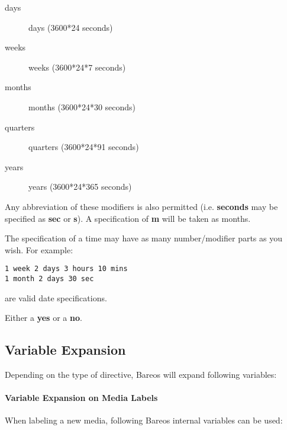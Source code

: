 \begin{description}
\begin{description}
\item [days]
   days (3600*24 seconds)

\item [weeks]
   weeks (3600*24*7 seconds)

\item [months]
   months (3600*24*30 seconds)

\item [quarters]
   quarters (3600*24*91 seconds)

\item [years]
   years (3600*24*365 seconds)
\end{description}

Any abbreviation of these modifiers is also permitted (i.e.  {\bf seconds}
may be specified as {\bf sec} or {\bf s}).  A specification of {\bf m} will
be taken as months.

The specification of a time may have as many number/modifier parts as you
wish.  For example:

\footnotesize
\begin{verbatim}
1 week 2 days 3 hours 10 mins
1 month 2 days 30 sec
\end{verbatim}
\normalsize

are valid date specifications.


\item [\yesno]
    \label{DataTypeYesNo}
   Either a {\bf yes} or a {\bf no}.


\end{description}




\subsection{Variable Expansion}
    \label{VarsChapter}

Depending on the type of directive, Bareos will expand following variables:

\paragraph{Variable Expansion on Media Labels}

When labeling a new media, following Bareos internal variables can be used:

